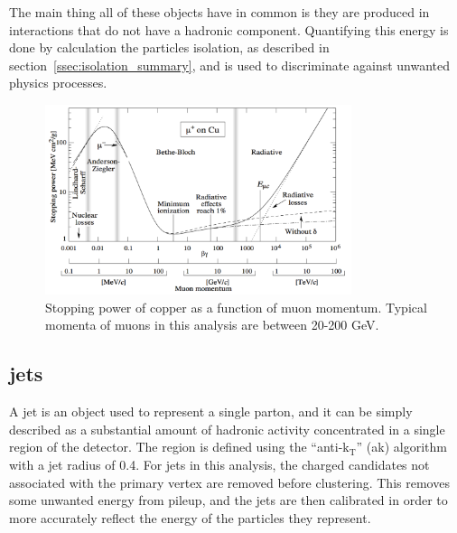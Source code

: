 The main thing all of these objects have in common is they are produced in interactions that do not have a hadronic component.
Quantifying this energy is done by calculation the particles isolation, as described in section~\ref{ssec:isolation_summary},
and is used to discriminate against unwanted physics processes.

\begin{figure}[!htb]
  \begin{center}
    \includegraphics[width=0.8\textwidth]{cms/figs/muon_energy_loss.pdf}
    \caption{
      \label{fig:muonenergyloss}
      Stopping power of copper as a function of muon momentum. Typical momenta of muons in this analysis are between 20-200 GeV. 
    }
  \end{center}
\end{figure}


\subsection{jets}
\label{ssec:jets}
A jet is an object used to represent a single parton, and it can be simply described as a substantial amount of hadronic activity concentrated in a single region of the detector.
The region is defined using the ``anti-$\mathrm{k_{T}}$'' (ak) algorithm~\cite{antikt} with a jet radius of 0.4.
For jets in this analysis, the charged candidates not associated with the primary vertex are removed before clustering. 
This removes some unwanted energy from pileup, and the jets are then calibrated in order to more accurately reflect the energy of the particles they represent.

